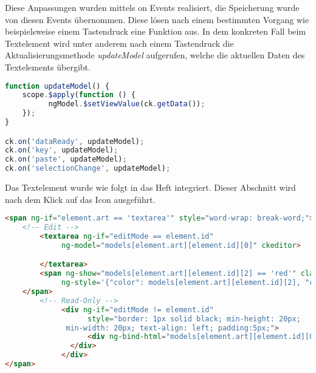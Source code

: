 Diese Anpassungen wurden mittels on Events realisiert, die Speicherung wurde von diesen Events übernommen. Diese lösen nach einem bestimmten Vorgang wie beispielsweise einem Tastendruck eine Funktion aus. In dem konkreten Fall beim Textelement wird unter anderem nach einem Tastendruck die Aktualisierungsmethode \textit{updateModel} aufgerufen, welche die aktuellen Daten des Textelements übergibt.
\begin{lstlisting}[caption={Speicherung des Textelements}, language=Javascript]
function updateModel() {
	scope.$apply(function () {
          ngModel.$setViewValue(ck.getData());
    });
}

ck.on('dataReady', updateModel);
ck.on('key', updateModel);
ck.on('paste', updateModel);
ck.on('selectionChange', updateModel);
\end{lstlisting}

Das Textelement wurde wie folgt in das Heft integriert. Dieser Abschnitt wird nach dem Klick auf das Icon ausgeführt.
\begin{lstlisting}[caption={Einbindung des Textelements}, language=HTML]
<span ng-if="element.art == 'textarea'" style="word-wrap: break-word;">
	<!-- Edit -->
        <textarea ng-if="editMode == element.id"
             ng-model="models[element.art][element.id][0]" ckeditor>

        </textarea>
        <span ng-show="models[element.art][element.id][2] == 'red'" class="glyphicon glyphicon-exclamation-sign"
             ng-style='{"color": models[element.art][element.id][2], "cursor": "pointer"}'>
	</span>
        <!-- Read-Only -->
             <div ng-if="editMode != element.id"
                   style="border: 1px solid black; min-height: 20px; 
			  min-width: 20px; text-align: left; padding:5px;">
                   <div ng-bind-html="models[element.art][element.id][0]" style="word-wrap: break-word; ">
	           </div>
             </div>
</span>
\end{lstlisting}


